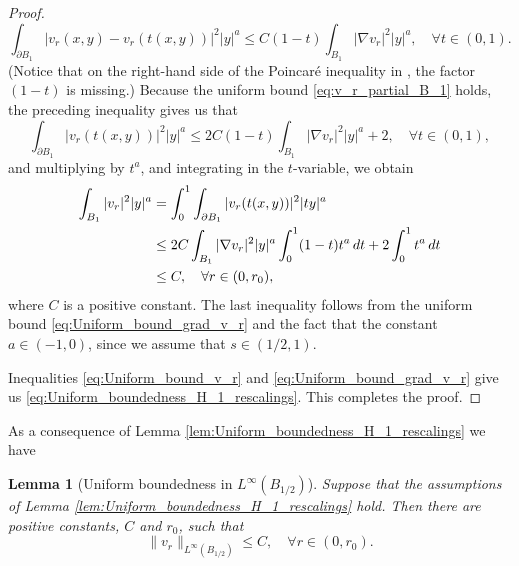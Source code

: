 \documentclass[11pt,reqno]{amsart}
\newtheorem{lem}[thm]{Lemma}
\theoremstyle{definition}
\theoremstyle{remark}
\begin{document}
\begin{proof}
$$
\int_{\partial B_1} |v_r(x,y)-v_r(t(x,y))|^2|y|^a \leq C(1-t) \int_{B_1} |\nabla v_r|^2|y|^a,\quad\forall t \in (0,1).
$$
(Notice that on the right-hand side of the Poincar\'e inequality in \cite[Lemma 2.12]{Caffarelli_Salsa_Silvestre_2008}, the factor $(1-t)$ is missing.) Because the uniform bound \eqref{eq:v_r_partial_B_1} holds, the preceding inequality gives us that
$$
\int_{\partial B_1} |v_r(t(x,y))|^2|y|^a \leq 2C(1-t) \int_{B_1} |\nabla v_r|^2|y|^a+2,\quad\forall t \in (0,1),
$$
and multiplying by $t^a$, and integrating in the $t$-variable, we obtain
\begin{align}
\int_{B_1} |v_r|^2|y|^a &=\int_0^1\int_{\partial B_1} |v_r(t(x,y))|^2|ty|^a\notag\\
&\leq 2C \int_{B_1} |\nabla v_r|^2|y|^a\int_0^1(1-t)t^a\, dt+2\int_0^1t^a\, dt\notag\\
\label{eq:Uniform_bound_v_r}
&\leq C, \quad \forall r \in (0,r_0),
\end{align}
where $C$ is a positive constant. The last inequality follows from the uniform bound \eqref{eq:Uniform_bound_grad_v_r} and the fact that the constant $a\in (-1,0)$, since we assume that $s\in (1/2,1)$. 

Inequalities \eqref{eq:Uniform_bound_v_r} and \eqref{eq:Uniform_bound_grad_v_r} give us \eqref{eq:Uniform_boundedness_H_1_rescalings}. This completes the proof.
\end{proof}

As a consequence of Lemma \ref{lem:Uniform_boundedness_H_1_rescalings} we have

\begin{lem}[Uniform boundedness in $L^{\infty}(B_{1/2})$]
\label{lem:Uniform_boundedness_rescalings}
Suppose that the assumptions of Lemma \ref{lem:Uniform_boundedness_H_1_rescalings} hold. Then there are positive constants, $C$ and $r_0$, such that
\begin{equation}
\label{eq:Uniform_boundedness_rescalings}
\|v_r\|_{L^{\infty}(B_{1/2})} \leq C,
\quad\forall r\in (0,r_0).
\end{equation}
\end{lem} 
\end{document}
